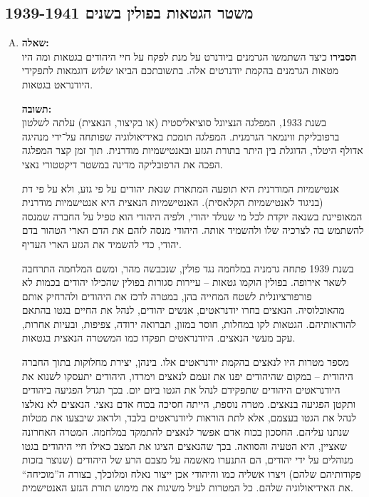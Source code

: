 \documentclass[a4paper]{article}
\begin{document}
	\renewcommand{\footrule}{\rule{\linewidth-26pt}{0.25pt}\vspace{-5pt}}
		
	\subsection{משטר הגטאות בפולין בשנים 1939-1941}
		\begin{enumerate}[A.]
			\item \textbf{שאלה: }\\
			\textbf{הסבירו} כיצד השתמשו הגרמנים ביודנרט על מנת לפקח על חיי היהודים בגטאות ומה היו מטאות הגרמנים בהקמת יודנרטים אלה. בתשובתכם הביאו \textit{שלוש} דוגמאות לתפקידי היודנראט בגטאות. 
			
			\textbf{תשובה: }\\
			בשנת 1933, המפלגה הנציונל סוציאליסטית (או בקיצור, הנאצית) עלתה לשלטון ברפובליקת ווינמאר הגרמנית. המפלגה תומכת באידיאולוגיה שפותחה על־ידי מנהיגה אדולף היטלר, הדוגלת בין היתר בתורת הגזע ובאנטישמיות מודרנית. תוך זמן קצר המפלגה הפכה את הרפובליקה מדינה במשטר דיקטטורי נאצי. 
			
			אנטישמיות המודרנית היא תופעה המתארת שנאת יהודים על פי גזע, ולא על פי דת (בניגוד לאנטישמיות הקלאסית). האנטישמיות הנאצית היא אנטישמיות מודרנית המאופיינת בשנאה יוקדת לכל מי שנולד יהודי, ולפיה היהודי הוא טפיל על החברה שמנסה להשתמש בה לצרכיה שלו ולהשמיד אותה. היהודי מנסה לזהם את הדם הארי הטהור בדם יהודי, כדי להשמיד את הגזע הארי העדיף. 
			
			בשנת 1939 פתחה גרמניה במלחמה נגד פולין, שנכבשה מהר, ומשם המלחמה התרחבה לשאר אירופה. בפולין הוקמו גטאות – עיירות סגורות בפולין שהכילו יהודים בכמות לא פורפורציונלית לשטח המחייה בהן, במטרה לרכז את היהודים ולהרחיק אותם מהאוכלוסיה. הנאצים בחרו יודנראטים, אנשים יהודים, לנהל את החיים בגטו בהתאם להוראותיהם. הגטאות לקו במחלות, חוסר במזון, תברואה ירודה, צפיפות, ובעיות אחרות, עקב מעשי הנאצים. היודנראטים תפקדו כמו המשטרה הנאצית בגטאות. 
			
			מספר מטרות היו לנאצים בהקמת יודנראטים אלו. בינהן, יצירת מחלוקות בתוך החברה היהודית – במקום שהיהודים יפנו את זעמם לנאצים וימרדו, היהודים יתעסקו לשנוא את היודנראטים היהודים שתפקידם לנהל את הגטו ביום יום. בכך תגדל הפגיעה ביהודים ותקטן הפגיעה בנאצים. מטרה נוספת, הייתה חסיכה בכוח אדם נאצי. הנאצים לא נאלצו לנהל את הגטו בעצמם, אלא לתת הוראות ליודנראטים בלבד, ולדאוג שיבצעו את מטלות שנתנו עליהם. החסכון בכוח אדם אפשר לנאצים להתמקד במלחמה. המטרה האחרונה שאציין, היא הטעיה והסוואה. בכך שהנאצים הציגו את המצב כאילו חיי היהודים בגטו מנוהלים על ידי יהודים, הם התנערו מאשמה על מצבם הרע של היהודים (שנוצר בזכות פקודותיהם שלהם) ויצרו אשליה כמו והיהודי אכן ייצור נאלח ומלוכלך, בצורה ה''מוכיחה`` את האידיאולוגיה שלהם. כל המטרות לעיל משיגות את מימוש תורת הגזע האנטישמית. 
			

\end{enumerate}
\end{document}
